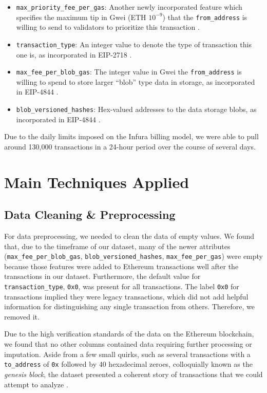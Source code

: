 \documentclass[sigconf]{acmart}
\begin{document}
\begin{itemize}
    \item \texttt{max\_priority\_fee\_per\_gas}: Another newly incorporated feature which specifies the maximum tip in Gwei (ETH $10^{-9}$) that the \texttt{from\_address} is willing to send to validators to prioritize this transaction \cite{LondonHardfork}.
    \item \texttt{transaction\_type}: An integer value to denote the type of transaction this one is, as incorporated in EIP-2718 \cite{TypedTransactions}.
    \item \texttt{max\_fee\_per\_blob\_gas}: The integer value in Gwei the \texttt{from\_address} is willing to spend to store larger “blob” type data in storage, as incorporated in EIP-4844 \cite{ProtoDanksharding}.
    \item \texttt{blob\_versioned\_hashes}: Hex-valued addresses to the data storage blobs, as incorporated in EIP-4844 \cite{ProtoDanksharding}.
\end{itemize}

Due to the daily limits imposed on the Infura billing model, we were able to pull around 130,000 transactions in a 24-hour period over the course of several days.  

\section{Main Techniques Applied}


\subsection{Data Cleaning \& Preprocessing}
For data preprocessing, we needed to clean the data of empty values. We found that, due to the timeframe of our dataset, many of the newer attributes (\texttt{max\_fee\_per\_blob\_gas}, \texttt{blob\_versioned\_hashes}, \texttt{max\_fee\_per\_gas}) were empty because those features were added to Ethereum transactions well after the transactions in our dataset. Furthermore, the default value for \texttt{transaction\_type}, \texttt{0x0}, was present for all transactions. The label \texttt{0x0} for transactions implied they were legacy transactions, which did not add helpful information for distinguishing any single transaction from others. Therefore, we removed it.

Due to the high verification standards of the data on the Ethereum blockchain, we found that no other columns contained data requiring further processing or imputation. Aside from a few small quirks, such as several transactions with a \texttt{to\_address} of \texttt{0x} followed by 40 hexadecimal zeroes, colloquially known as the \textit{genesis block}, the dataset presented a coherent story of transactions that we could attempt to analyze \cite{GenesisBlock}.
\end{document}
